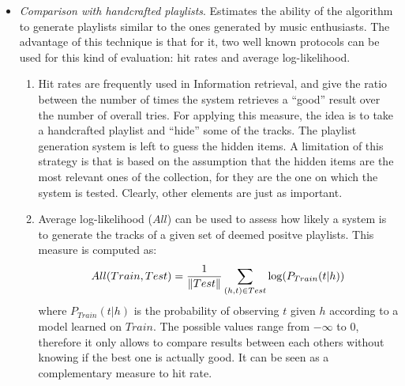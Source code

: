 \begin{itemize}
\item \textit{Comparison with handcrafted playlists}. Estimates the ability of the algorithm to generate playlists similar to the ones generated by music enthusiasts. The advantage of this technique is that for it, two well known protocols can be used for this kind of evaluation: hit rates and average log-likelihood. 
\begin{enumerate}
\item Hit rates are frequently used in Information retrieval, and give the ratio between the number of times the system retrieves a ``good'' result over the number of overall tries. For applying this measure, the idea is to take a handcrafted playlist and ``hide'' some of the tracks. The playlist generation system is left to guess the hidden items. A limitation of this strategy is that is based on the assumption that the hidden items are the most relevant ones of the collection, for they are the one on which the system is tested. Clearly, other elements are just as important. 
\item Average log-likelihood ($All$) can be used to assess how likely a system is to generate the tracks of a given set of deemed positve playlists. This measure is computed as:
\begin{equation}
All(Train, Test) = \frac{1}{\lVert Test\rVert} \sum\limits_{(h,t) \in Test}^{} \log (P_{Train} (t | h))
\end{equation}
where $P_{Train}(t|h)$ is the probability of observing $t$ given $h$ according to a model learned on $Train$. The possible values range from $- \infty$ to 0, therefore it only allows to compare results between each others without knowing if the best one is actually good. It can be seen as a complementary measure to hit rate.
\end{enumerate}
\end{itemize}


